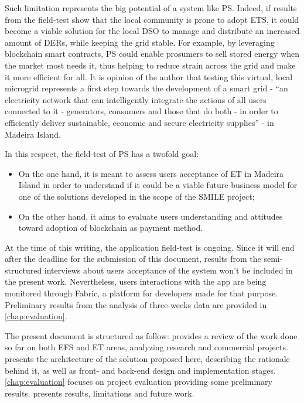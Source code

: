 Such limitation represents the big potential of a system like \ac{PS}. Indeed, if results from the field-test show that the local community is prone to adopt \ac{ETS}, it could become a viable solution for the local \ac{DSO} to manage and distribute an increased amount of \acp{DER}, while keeping the grid stable. For example, by leveraging blockchain smart contracts, \ac{PS} could enable prosumers to sell stored energy when the market most needs it, thus helping to reduce strain across the grid and make it more efficient for all.
It is opinion of the author that testing this virtual, local microgrid represents a first step towards the development of a smart grid -  “an electricity network that can intelligently integrate the actions of all users connected to it - generators, consumers and those that do both - in order to efficiently deliver sustainable, economic and secure electricity supplies” \cite{OverviewSmartGrid} - in Madeira Island.


In this respect, the field-test of \ac{PS} has a twofold goal:

\begin{itemize}
    \item On the one hand, it is meant to assess users acceptance of \ac{ET} in Madeira Island in order to understand if it could be a viable future business model  for one of the solutions developed in the scope of the SMILE project;
\item On the other hand, it aims to evaluate users understanding  and attitudes toward adoption of blockchain as  payment method.
\end{itemize}


At the time of this writing, the application field-test is ongoing. Since it will end after the deadline for the submission of this document, results from the semi-structured interviews about users acceptance of the system won’t be included in the present work. Nevertheless, users interactions with the app are being monitored through Fabric, a platform for developers made for that purpose. Preliminary results from the analysis of three-weeks data are provided in \cref{chap:evaluation}.

The present document is structured as follow:  provides a review of the work done so far on both \ac{EFS} and \ac{ET} areas, analyzing research and commercial projects.  presents the architecture of the solution proposed here, describing the rationale behind it, as well as front- and back-end design and implementation stages.
\cref{chap:evaluation} focuses on project evaluation providing some preliminary results.  presents results, limitations and future work.


